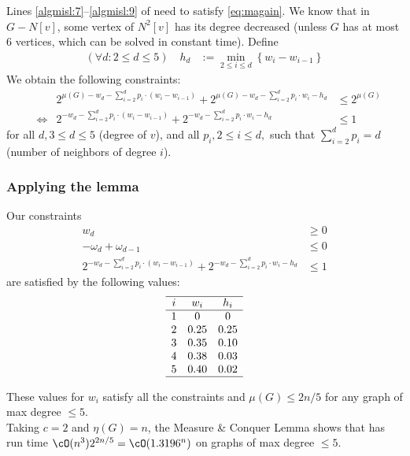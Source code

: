 \begin{frame}

Lines \ref{algmisl:7}--\ref{algmisl:9} of \algmis need to satisfy \eqref{eq:magain}.
 We know that in $G - N[v]$, some vertex of $N^2[v]$ has its degree decreased (unless $G$ has at most 6 vertices, which can be solved in constant time).
 Define
 \begin{align*}
 (\forall d: 2 \le d \le 5) \quad h_d &:= \min_{2 \le i \le d} \left\{ w_i-w_{i-1} \right\}
 \end{align*}
 We obtain the following constraints:
\begin{align*}
 && 2^{\mu(G) - w_d - \sum_{i=2}^d p_i \cdot (w_i-w_{i-1})} +
 2^{\mu(G) - w_d - \sum_{i=2}^d p_i \cdot w_i - h_d} &\le 2^{\mu(G)}\\
 &\Leftrightarrow& 2^{- w_d - \sum_{i=2}^d p_i \cdot (w_i-w_{i-1})} +
 2^{- w_d - \sum_{i=2}^d p_i \cdot w_i - h_d} &\le 1
\end{align*}
for all $d, 3 \le d \le 5$ (degree of $v$), and all $p_i, 2 \le i \le d,$ such that $\sum_{i=2}^d p_i = d$ (number of neighbors of degree $i$).
\end{frame}

\begin{frame}
 \frametitle{Applying the lemma}

Our constraints
\begin{align*}
 w_d &\ge 0\\
 -\omega_d+\omega_{d-1} &\le 0\\
 2^{- w_d - \sum_{i=2}^d p_i \cdot (w_i-w_{i-1})} +
 2^{- w_d - \sum_{i=2}^d p_i \cdot w_i - h_d} &\le 1
\end{align*}
are satisfied by the following values:
\pause
\[
 \begin{array}{ c c c }
  \hline
  i & w_i & h_i\\
  \hline
  1 & 0 & 0\\
  2 & 0.25 & 0.25\\
  3 & 0.35 & 0.10\\
  4 & 0.38 & 0.03\\
  5 & 0.40 & 0.02\\
  \hline
 \end{array}
\]

These values for $w_i$ satisfy all the constraints and $\mu(G) \le 2n/5$ for any graph of max degree $\le 5$.\\
Taking $c=2$ and $\eta(G)=n$, the Measure \& Conquer Lemma shows that \algmis
has run time $\cO(n^3) 2^{2n/5} = \cO(1.3196^n)$ on graphs of max degree
$\le 5$.

\end{frame}

